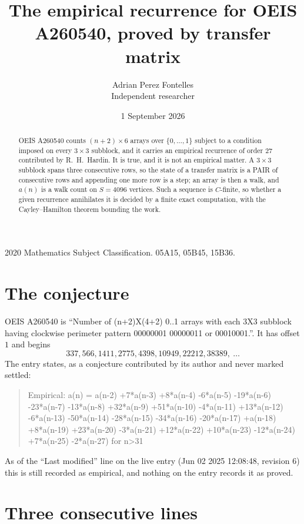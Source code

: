 \documentclass[11pt,a4paper]{article}
\title{The empirical recurrence for OEIS A260540, proved by transfer matrix}
\author{Adrian Perez Fontelles\\ \small Independent researcher}
\date{1 September 2026}
\theoremstyle{plain}
\theoremstyle{definition}
\begin{document}
\maketitle

\begin{abstract}
OEIS A260540 counts $(n+2)\times6$ arrays over $\{0,\dots,1\}$ subject to a condition imposed on
every $3\times3$ subblock, and it carries an empirical recurrence of order $27$
contributed by R.~H.~Hardin. It is true, and it is not an empirical matter. A $3\times3$
subblock spans three consecutive rows, so the state of a transfer matrix is a PAIR of
consecutive rows and appending one more row is a step; an array is then a walk, and
$a(n)$ is a walk count on $S=4096$ vertices. Such a sequence is $C$-finite, so whether a given
recurrence annihilates it is decided by a finite exact computation, with the Cayley--Hamilton
theorem bounding the work.
\end{abstract}

\noindent\small 2020 Mathematics Subject Classification. 05A15, 05B45, 15B36.\normalsize

\section{The conjecture}

OEIS A260540 is ``Number of (n+2)X(4+2) 0..1 arrays with each 3X3 subblock having clockwise perimeter pattern 00000001 00000011 or 00010001.''. It has offset $1$ and begins
\[
337, 566, 1411, 2775, 4398, 10949, 22212, 38389,\ \dots
\]
The entry states, as a conjecture contributed by its author and never marked settled:
\begin{quote}
Empirical: a(n) = a(n-2) +7*a(n-3) +8*a(n-4) -6*a(n-5) -19*a(n-6) -23*a(n-7) -13*a(n-8) +32*a(n-9) +51*a(n-10) -4*a(n-11) +13*a(n-12) -6*a(n-13) -50*a(n-14) -28*a(n-15) -34*a(n-16) -20*a(n-17) +a(n-18) +8*a(n-19) +23*a(n-20) -3*a(n-21) +12*a(n-22) +10*a(n-23) -12*a(n-24) +7*a(n-25) -2*a(n-27) for n>31
\end{quote}
As of the ``Last modified'' line on the live entry (Jun 02 2025 12:08:48, revision 6) this is still
recorded as empirical, and nothing on the entry records it as proved.

\section{Three consecutive lines}
\end{document}
